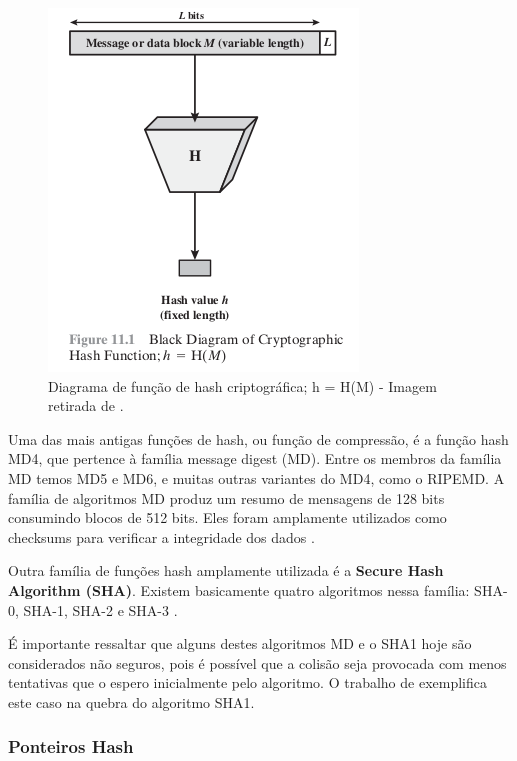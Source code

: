                 \begin{figure}[h]
                     \centering
                     \includegraphics[scale=0.5]{figuras/capitulo_2/hash_function.png}
                     \caption{Diagrama de função de hash criptográfica; h = H(M) - Imagem retirada de \cite{cryptograpy_and_network_stallings}.}
                     \label{fig:hash_function}
                \end{figure}
                
        Uma das mais antigas funções de hash, ou função de compressão, é a função hash MD4, que pertence à família message digest (MD). Entre os membros da família MD temos MD5 e MD6, e muitas outras variantes do MD4, como o RIPEMD. A família de algoritmos MD produz um resumo de mensagens de 128 bits consumindo blocos de 512 bits. Eles foram amplamente utilizados como checksums para verificar a integridade dos dados \cite{beginnig_blockchain_bikramaditya}.
        
        Outra família de funções hash amplamente utilizada é a \textbf{Secure Hash Algorithm (SHA)}. Existem basicamente quatro algoritmos nessa família: SHA-0, SHA-1, SHA-2 e SHA-3 \cite{beginnig_blockchain_bikramaditya}.

	É importante ressaltar que alguns destes algoritmos MD e o SHA1 hoje são considerados não seguros, pois é possível que a colisão seja provocada com menos tentativas que o espero inicialmente pelo algoritmo. O trabalho de \cite{collision_sha1} exemplifica este caso na quebra do algoritmo SHA1.
    
        \subsubsection{Ponteiros Hash}
        
